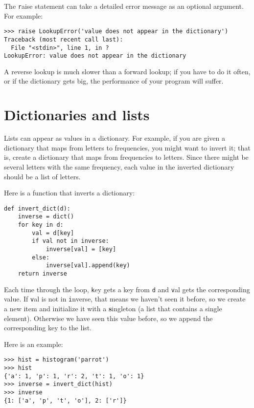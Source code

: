 \documentclass[
DIV=11,
fontsize=13,
twoside,
headinclude=false,
titlepage=firstiscover,
abstract=true,
headsepline=true,
footsepline=true,
chapterprefix=true, %
headings=big,
bibliography=totoc,%
captions=tableheading
]{scrbook}
\theoremstyle{definition}
\begin{document}
The {\texttt raise} statement can take a detailed error message as an
optional argument.  For example:

\begin{lstlisting}
>>> raise LookupError('value does not appear in the dictionary')
Traceback (most recent call last):
  File "<stdin>", line 1, in ?
LookupError: value does not appear in the dictionary
\end{lstlisting}
%
A reverse lookup is much slower than a forward lookup; if you
have to do it often, or if the dictionary gets big, the performance
of your program will suffer.


\section{Dictionaries and lists}
\label{invert}

Lists can appear as values in a dictionary.  For example, if you
are given a dictionary that maps from letters to frequencies, you
might want to invert it; that is, create a dictionary that maps
from frequencies to letters.  Since there might be several letters
with the same frequency, each value in the inverted dictionary
should be a list of letters.

Here is a function that inverts a dictionary:

\begin{lstlisting}
def invert_dict(d):
    inverse = dict()
    for key in d:
        val = d[key]
        if val not in inverse:
            inverse[val] = [key]
        else:
            inverse[val].append(key)
    return inverse
\end{lstlisting}
%
Each time through the loop, {\texttt key} gets a key from {\texttt d} and 
{\texttt val} gets the corresponding value.  If {\texttt val} is not in {\texttt
  inverse}, that means we haven't seen it before, so we create a new
item and initialize it with a {\textbf singleton} (a list that contains a
single element).  Otherwise we have seen this value before, so we
append the corresponding key to the list.  

Here is an example:

\begin{lstlisting}
>>> hist = histogram('parrot')
>>> hist
{'a': 1, 'p': 1, 'r': 2, 't': 1, 'o': 1}
>>> inverse = invert_dict(hist)
>>> inverse
{1: ['a', 'p', 't', 'o'], 2: ['r']}
\end{lstlisting}
\end{document}
